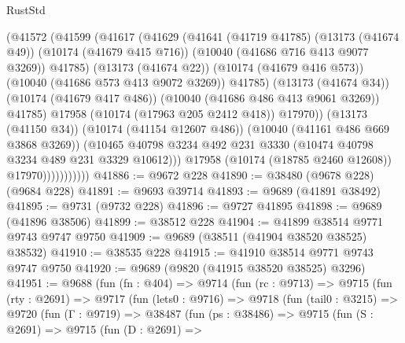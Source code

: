 \begin{lexlean}{RustStd}
\begin{coremodule}
                            (@41572
                              (@41599
                                (@41617
                                  (@41629
                                    (@41641
                                      (@41719 @41785)
                                      (@13173 (@41674 @49))
                                      (@10174 (@41679 @415 @716))
                                      (@10040 (@41686 @716 @413 @9077 @3269))
                                      @41785)
                                    (@13173 (@41674 @22))
                                    (@10174 (@41679 @416 @573))
                                    (@10040 (@41686 @573 @413 @9072 @3269))
                                    @41785)
                                  (@13173 (@41674 @34))
                                  (@10174 (@41679 @417 @486))
                                  (@10040 (@41686 @486 @413 @9061 @3269))
                                  @41785)
                                @17958
                                (@10174 (@17963 @205 @2412 @418))
                                @17970))
                            (@13173 (@41150 @34))
                            (@10174 (@41154 @12607 @486))
                            (@10040 (@41161 @486 @669 @3868 @3269))
                            (@10465
                              @40798
                              @3234
                              @492
                              @231
                              @3330
                              (@10474 @40798 @3234 @489 @231 @3329 @10612)))
                          @17958
                          (@10174 (@18785 @2460 @12608))
                          @17970)))))))))))
@41886 := @9672 @228
@41890 := @38480 (@9678 @228) (@9684 @228)
@41891 := @9693 @39714
@41893 := @9689 (@41891 @38492)
@41895 := @9731 (@9732 @228)
@41896 := @9727 @41895
@41898 := @9689 (@41896 @38506)
@41899 := @38512 @228
@41904 := @41899 @38514 @9771 @9743 @9747 @9750
@41909 := @9689 (@38511 (@41904 @38520 @38525) @38532)
@41910 := @38535 @228
@41915 := @41910 @38514 @9771 @9743 @9747 @9750
@41920 := @9689 (@9820 (@41915 @38520 @38525) @3296)
@41951 := @9688
    (fun (fn : @404) =>
    @9714
      (fun (rc : @9713) =>
      @9715
        (fun (rty : @2691) =>
        @9717
          (fun (lets0 : @9716) =>
          @9718
            (fun (tail0 : @3215) =>
            @9720
              (fun (Γ : @9719) =>
              @38487
                (fun (ps : @38486) =>
                @9715
                  (fun (S : @2691) =>
                  @9715
                    (fun (D : @2691) =>

\end{coremodule}
\end{lexlean}
